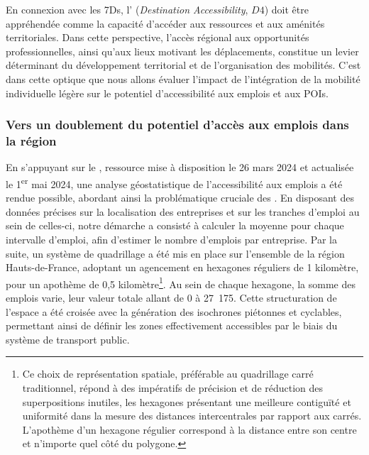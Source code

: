 \begin{refsegment}
En connexion avec les \acrfull{7Ds}, l' (\textsl{Destination Accessibility}, \(D4\)) doit être appréhendée comme la capacité d'accéder aux ressources et aux aménités territoriales. Dans cette perspective, l'accès régional aux opportunités professionnelles, ainsi qu'aux lieux motivant les déplacements, constitue un levier déterminant du développement territorial et de l'organisation des mobilités. C'est dans cette optique que nous allons évaluer l'impact de l'intégration de la mobilité individuelle légère sur le potentiel d'accessibilité aux emplois et aux \acrfull{POIs}.%

\subsubsection*{Vers un doublement du potentiel d'accès aux emplois dans la région
    \label{chap5:potentiel-accessibilite-emplois}
    }

En s'appuyant sur le \textcolor{blue}{\textcite{repertoire_sirene_des_entreprises_et_de_leurs_etablissements_base_2024}}, ressource mise à disposition le 26 mars 2024 et actualisée le 1\textsuperscript{er} mai 2024, une analyse géostatistique de l'accessibilité aux emplois a été rendue possible, abordant ainsi la problématique cruciale des . En disposant des données précises sur la localisation des entreprises et sur les tranches d'emploi au sein de celles-ci, notre démarche a consisté à calculer la moyenne pour chaque intervalle d'emploi, afin d'estimer le nombre d'emplois par entreprise. Par la suite, un système de quadrillage a été mis en place sur l'ensemble de la région Hauts-de-France, adoptant un agencement en hexagones réguliers de 1 kilomètre, pour un apothème de 0,5 kilomètre\footnote{
    Ce choix de représentation spatiale, préférable au quadrillage carré traditionnel, répond à des impératifs de précision et de réduction des superpositions inutiles, les hexagones présentant une meilleure contiguïté et uniformité dans la mesure des distances intercentrales par rapport aux carrés. L'apothème d'un hexagone régulier correspond à la distance entre son centre et n'importe quel côté du polygone.
}. Au sein de chaque hexagone, la somme des emplois varie, leur valeur totale allant de 0 à 27~175. Cette structuration de l'espace a été croisée avec la génération des isochrones piétonnes et cyclables, permettant ainsi de définir les zones effectivement accessibles par le biais du système de transport public.%


\end{refsegment}
